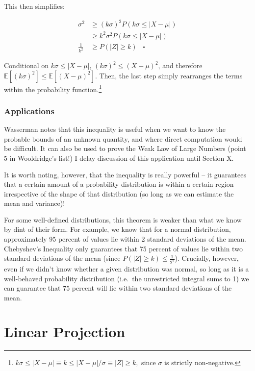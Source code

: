 \documentclass[
]{book}
\begin{document}
This then simplifies:

\[
\begin{aligned}
    \sigma^2 &\geq (k\sigma)^2P(k\sigma \leq |X - \mu|) \\
    &\geq k^2\sigma^2P(k\sigma \leq |X - \mu|) \\
    \frac{1}{k^2} &\geq P(|Z| \geq k) \; \; \; \square
\end{aligned}
\]

Conditional on \(k\sigma \leq |X-\mu|\), \((k\sigma)^2 \leq (X-\mu)^2\), and therefore \(\mathbb{E}[(k\sigma)^2] \leq \mathbb{E}[(X-\mu)^2]\). Then, the last step simply rearranges the terms within the probability function.\footnote{\(k\sigma \leq |X-\mu| \equiv k \leq |X-\mu|/\sigma \equiv |Z| \geq k,\) since \(\sigma\) is strictly non-negative.}

\hypertarget{applications}{%
\subsection{Applications}\label{applications}}

Wasserman notes that this inequality is useful when we want to know the probable bounds of an unknown quantity, and where direct computation would be difficult. It can also be used to prove the Weak Law of Large Numbers (point 5 in Wooldridge's list!) I delay discussion of this application until Section X.

It is worth noting, however, that the inequality is really powerful -- it guarantees that a certain amount of a probability distribution is within a certain region -- irrespective of the shape of that distribution (so long as we can estimate the mean and variance)!

For some well-defined distributions, this theorem is weaker than what we know by dint of their form. For example, we know that for a normal distribution, approximately 95 percent of values lie within 2 standard deviations of the mean. Chebyshev's Inequality only guarantees that 75 percent of values lie within two standard deviations of the mean (since \(P(|Z| \geq k) \leq \frac{1}{2^2}\)). Crucially, however, even if we didn't know whether a given distribution was normal, so long as it is a well-behaved probability distribution (i.e.~the unrestricted integral sums to 1) we can guarantee that 75 percent will lie within two standard deviations of the mean.

\hypertarget{linear_projection}{%
\chapter{Linear Projection}\label{linear_projection}}
\end{document}
